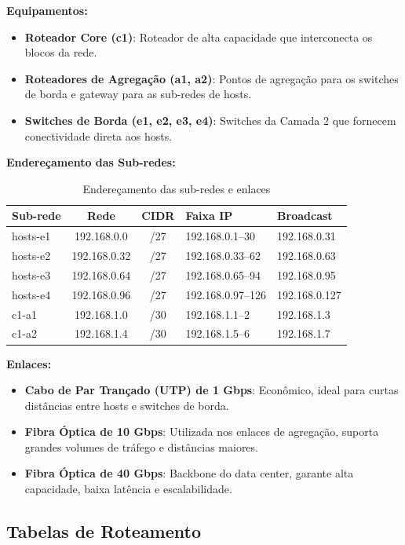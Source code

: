 \documentclass[conference,compsoc]{IEEEtran}
\begin{document}
\begin{otherlanguage}{brazil}
\textbf{Equipamentos:}
\begin{itemize}
    \item \textbf{Roteador Core (c1)}: Roteador de alta capacidade que interconecta os blocos da rede.
    \item \textbf{Roteadores de Agregação (a1, a2)}: Pontos de agregação para os switches de borda e gateway para as sub-redes de hosts.
    \item \textbf{Switches de Borda (e1, e2, e3, e4)}: Switches da Camada 2 que fornecem conectividade direta aos hosts.
\end{itemize}

\textbf{Endereçamento das Sub-redes:}

\begin{table}[h]
\small
\begin{tabularx}{\linewidth}{|l|c|c|X|X|}
\hline
Sub-rede & Rede & CIDR & Faixa IP & Broadcast \\
\hline
hosts-e1 & 192.168.0.0 & /27 & 192.168.0.1--30 & 192.168.0.31 \\
\hline
hosts-e2 & 192.168.0.32 & /27 & 192.168.0.33--62 & 192.168.0.63 \\
\hline
hosts-e3 & 192.168.0.64 & /27 & 192.168.0.65--94 & 192.168.0.95 \\
\hline
hosts-e4 & 192.168.0.96 & /27 & 192.168.0.97--126 & 192.168.0.127 \\
\hline
c1-a1 & 192.168.1.0 & /30 & 192.168.1.1--2 & 192.168.1.3 \\
\hline
c1-a2 & 192.168.1.4 & /30 & 192.168.1.5--6 & 192.168.1.7 \\
\hline
\end{tabularx}
\caption{Endereçamento das sub-redes e enlaces}
\end{table}

\textbf{Enlaces:}
\begin{itemize}
    \item \textbf{Cabo de Par Trançado (UTP) de 1 Gbps}: Econômico, ideal para curtas distâncias entre hosts e switches de borda.
    \item \textbf{Fibra Óptica de 10 Gbps}: Utilizada nos enlaces de agregação, suporta grandes volumes de tráfego e distâncias maiores.
    \item \textbf{Fibra Óptica de 40 Gbps}: Backbone do data center, garante alta capacidade, baixa latência e escalabilidade.
\end{itemize}

\subsection{Tabelas de Roteamento}


\end{otherlanguage}
\end{document}
